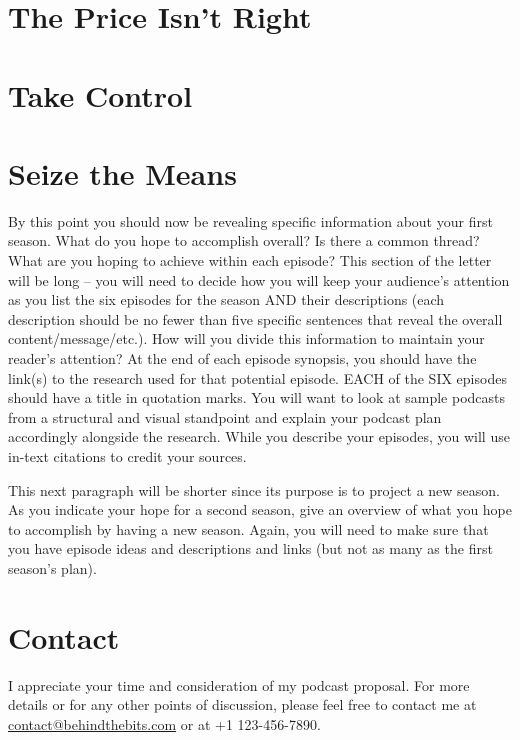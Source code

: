 \documentclass[12pt]{article}
\begin{document}
\section{The Price Isn't Right}

\section{Take Control}

\section{Seize the Means}

By this point you should now be revealing specific information about your first season. What do you hope to accomplish overall? Is there a common thread? What are you hoping to achieve within each episode? This section of the letter will be long – you will need to decide how you will keep your audience’s attention as you list the six episodes for the season AND their descriptions (each description should be no fewer than five specific sentences that reveal the overall content/message/etc.). How will you divide this information to maintain your reader’s attention? At the end of each episode synopsis, you should have the link(s) to the research used for that potential episode. EACH of the SIX episodes should have a title in quotation marks. You will want to look at sample podcasts from a structural and visual standpoint and explain your podcast plan accordingly alongside the research. While you describe your episodes, you will use in-text citations to credit your sources.

This next paragraph will be shorter since its purpose is to project a new season. As you indicate your hope for a second season, give an overview of what you hope to accomplish by having a new season. Again, you will need to make sure that you have episode ideas and descriptions and links (but not as many as the first season’s plan).

\section*{Contact}
I appreciate your time and consideration of my podcast proposal. For more
details or for any other points of discussion, please feel free to contact me at
\href{mailto:contact@behindthebits.com}{contact@behindthebits.com} or at +1 123-456-7890.
\end{document}
